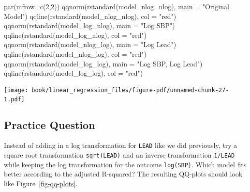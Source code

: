 \documentclass[
  letterpaper,
]{latex/krantz}
\makeatletter
\newenvironment{Shaded}{\begin{snugshade}}{\end{snugshade}}
\newcommand{\AttributeTok}[1]{\textcolor[rgb]{0.40,0.45,0.13}{#1}}
\newcommand{\DecValTok}[1]{\textcolor[rgb]{0.68,0.00,0.00}{#1}}
\newcommand{\FunctionTok}[1]{\textcolor[rgb]{0.28,0.35,0.67}{#1}}
\newcommand{\NormalTok}[1]{\textcolor[rgb]{0.00,0.23,0.31}{#1}}
\newcommand{\StringTok}[1]{\textcolor[rgb]{0.13,0.47,0.30}{#1}}
\newenvironment{kframe}{%
\medskip{}
\setlength{\fboxsep}{.8em}
 \def\at@end@of@kframe{}%
 \ifinner\ifhmode%
  \def\at@end@of@kframe{\end{minipage}}%
  \begin{minipage}{\columnwidth}%
 \fi\fi%
 \def\FrameCommand##1{\hskip\@totalleftmargin \hskip-\fboxsep
 \colorbox{shadecolor}{##1}\hskip-\fboxsep
     \hskip-\linewidth \hskip-\@totalleftmargin \hskip\columnwidth}%
 \MakeFramed {\advance\hsize-\width
   \@totalleftmargin\z@ \linewidth\hsize
   \@setminipage}}%
 {\par\unskip\endMakeFramed%
 \at@end@of@kframe}
\renewenvironment{Shaded}{\begin{kframe}}{\end{kframe}}
\makeatother
\begin{document}
\begin{Shaded}
\begin{Highlighting}[]
\FunctionTok{par}\NormalTok{(}\AttributeTok{mfrow=}\FunctionTok{c}\NormalTok{(}\DecValTok{2}\NormalTok{,}\DecValTok{2}\NormalTok{))}
\FunctionTok{qqnorm}\NormalTok{(}\FunctionTok{rstandard}\NormalTok{(model\_nlog\_nlog), }\AttributeTok{main =} \StringTok{"Original Model"}\NormalTok{) }
\FunctionTok{qqline}\NormalTok{(}\FunctionTok{rstandard}\NormalTok{(model\_nlog\_nlog), }\AttributeTok{col =} \StringTok{"red"}\NormalTok{)}
\FunctionTok{qqnorm}\NormalTok{(}\FunctionTok{rstandard}\NormalTok{(model\_log\_nlog), }\AttributeTok{main =} \StringTok{"Log SBP"}\NormalTok{) }
\FunctionTok{qqline}\NormalTok{(}\FunctionTok{rstandard}\NormalTok{(model\_log\_nlog), }\AttributeTok{col =} \StringTok{"red"}\NormalTok{)}
\FunctionTok{qqnorm}\NormalTok{(}\FunctionTok{rstandard}\NormalTok{(model\_nlog\_log), }\AttributeTok{main =} \StringTok{"Log Lead"}\NormalTok{) }
\FunctionTok{qqline}\NormalTok{(}\FunctionTok{rstandard}\NormalTok{(model\_nlog\_log), }\AttributeTok{col =} \StringTok{"red"}\NormalTok{)}
\FunctionTok{qqnorm}\NormalTok{(}\FunctionTok{rstandard}\NormalTok{(model\_log\_log), }\AttributeTok{main =} \StringTok{"Log SBP, Log Lead"}\NormalTok{) }
\FunctionTok{qqline}\NormalTok{(}\FunctionTok{rstandard}\NormalTok{(model\_log\_log), }\AttributeTok{col =} \StringTok{"red"}\NormalTok{)}
\end{Highlighting}
\end{Shaded}

\begin{center}
\texttt{[image: book/linear\_regression\_files/figure-pdf/unnamed-chunk-27-1.pdf]}
\end{center}

\subsection{Practice Question}\label{practice-question-22}

Instead of adding in a log transformation for \texttt{LEAD} like we did
previously, try a square root transformation \texttt{sqrt(LEAD)} and an
inverse transformation \texttt{1/LEAD} while keeping the log
transformation for the outcome \texttt{log(SBP)}. Which model fits
better according to the adjusted R-squared? The resulting QQ-plots
should look like Figure~\ref{fig-qq-plots}.
\end{document}
